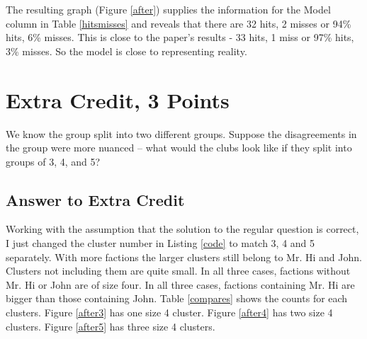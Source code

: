 \documentclass{article}
\begin{document}
The resulting graph (Figure \ref{after}) supplies the information for the Model column in Table \ref{hitsmisses} and reveals that there are 32 hits, 2 misses or 94\% hits, 6\% misses. This is close to the paper's results - 33 hits, 1 miss or 97\% hits, 3\% misses. So the model is close to representing reality.\\

\newpage

\section*{Extra Credit, 3 Points}

We know the group split into two different groups. Suppose the disagreements in the group were more nuanced -- what would the clubs look like if they split into groups of 3, 4, and 5?


\subsection*{Answer to Extra Credit}

Working with the assumption that the solution to the regular question is correct, I just changed the cluster number in Listing \ref{code} to match 3, 4 and 5 separately. With more factions the larger clusters still belong to Mr. Hi and John. Clusters not including them are quite small. In all three cases, factions without Mr. Hi or John are of size four. In all three cases, factions containing Mr. Hi are bigger than those containing John. Table \ref{compares} shows the counts for each clusters. Figure \ref{after3} has one size 4 cluster. Figure \ref{after4} has two size 4 clusters. Figure \ref{after5} has three size 4 clusters. 
\end{document}

